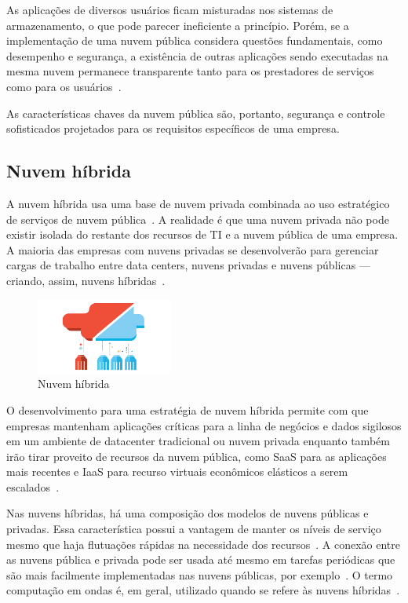 As aplicações de diversos usuários ficam misturadas nos sistemas de armazenamento,
o que pode parecer ineficiente a princípio. Porém, se a implementação de uma nuvem
pública considera questões fundamentais, como desempenho e segurança, a existência
de outras aplicações sendo executadas na mesma nuvem permanece transparente tanto
para os prestadores de serviços como para os usuários~\cite{technet-cloud-computing}.

As características chaves da nuvem pública são, portanto, segurança e controle
sofisticados projetados para os requisitos específicos de uma empresa.

\subsection{Nuvem híbrida}

A nuvem híbrida usa uma base de nuvem privada combinada ao uso estratégico de 
serviços de nuvem pública~\cite{ibm-what-is-cloud-computing}. A realidade é que uma 
nuvem privada não pode existir isolada do restante dos recursos de TI e a nuvem 
pública de uma empresa. A maioria das empresas com nuvens privadas se desenvolverão 
para gerenciar cargas de trabalho entre data centers, nuvens privadas e nuvens 
públicas --- criando, assim, nuvens híbridas~\cite{ibm-what-is-cloud-computing}.

\begin{figure}[ht]
    \centering
    \includegraphics[width=0.4\textwidth]{img/hybrid.png}
    \caption{Nuvem híbrida~\cite{ibm-what-is-cloud-computing}}
    \label{img:hybridcloud}
\end{figure}

O desenvolvimento para uma estratégia de nuvem híbrida permite com que empresas 
mantenham aplicações críticas para a linha de negócios e dados sigilosos em um 
ambiente de datacenter tradicional ou nuvem privada enquanto também irão tirar 
proveito de recursos da nuvem pública, como SaaS para as aplicações mais recentes e 
IaaS para recurso virtuais econômicos elásticos a serem 
escalados~\cite{ibm-what-is-cloud-computing}.

Nas nuvens híbridas, há uma composição dos modelos de nuvens públicas e privadas. 
Essa característica possui a vantagem de manter os níveis de serviço mesmo que haja 
flutuações rápidas na necessidade dos recursos~\cite{technet-cloud-computing}. A 
conexão entre as nuvens pública e privada pode ser usada até mesmo em tarefas 
periódicas que são mais facilmente implementadas nas nuvens públicas, por 
exemplo~\cite{technet-cloud-computing}. O termo computação em ondas é, em geral, 
utilizado quando se refere às nuvens híbridas~\cite{technet-cloud-computing}.


